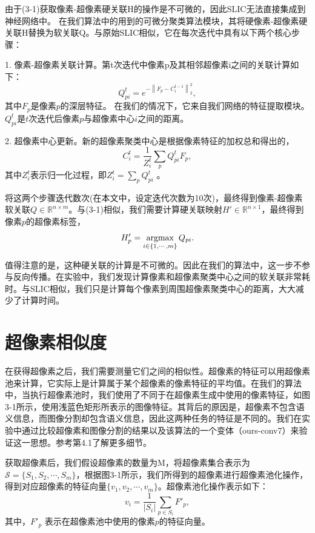 由于(3-1)获取像素-超像素硬关联H的操作是不可微的，因此SLIC无法直接集成到神经网络中。 在我们算法中的用到的可微分聚类算法模块，其将硬像素-超像素硬关联H替换为软关联Q。与原始SLIC相似，它在每次迭代中具有以下两个核心步骤：

1.	像素-超像素关联计算。第t次迭代中像素p及其相邻超像素i之间的关联计算如下：
\begin{equation}
Q_{pi}^{t} = e^{-\left \| F_{p}-C_{i}^{t-1}\right \|_2^2},
\end{equation}
其中\(F_{p}\)是像素$p$的深层特征。 在我们的情况下，它来自我们网络的特征提取模块。\(Q_{pi}^{t}\)是$t$次迭代后像素$p$与超像素中心$i$之间的距离。

2.	超像素中心更新。新的超像素聚类中心是根据像素特征的加权总和得出的，
\begin{equation}
C_{i}^{t} = \frac{1}{Z_{i}^{t}}\sum_{p}Q_{pi}^{t}F_{p},
\end{equation}
其中$Z_{i}^{t}$表示归一化过程，即$Z_{i}^{t} = \sum\nolimits_{p}Q_{pi}^{t} $ 。

将这两个步骤迭代数次(在本文中，设定迭代次数为10次)，最终得到像素-超像素软关联\(Q\in\mathbb{R}^{n\times m}\)。与(3-1)相似，我们需要计算硬关联映射$H'\in \mathbb{R}^{n\times 1}$，最终得到像素$p$的超像素标签，
\begin{equation}
H'_{p} =  \mathop{{{\rm argmax}}}\limits_{{i \in \left\{ 1, \cdots ,m \right\} }}Q_{pi}.
\label{equation.3}
\end{equation}

值得注意的是，这种硬关联的计算是不可微的。因此在我们的算法中，这一步不参与反向传播。在实验中，我们发现计算像素和超像素聚类中心之间的软关联非常耗时。与SLIC相似，我们只是计算每个像素到周围超像素聚类中心的距离，大大减少了计算时间。

\section{超像素相似度}
在获得超像素之后，我们需要测量它们之间的相似性。超像素的特征可以用超像素池来计算，它实际上是计算属于某个超像素的像素特征的平均值。在我们的算法中，当执行超像素池时，我们使用了不同于在超像素生成中使用的像素特征，如图3-1所示，使用浅蓝色矩形所表示的图像特征。其背后的原因是，超像素不包含语义信息，而图像分割却包含语义信息，因此这两种任务的特征是不同的。我们在实验中通过比较超像素和图像分割的结果以及该算法的一个变体（ours-conv7）来验证这一思想。参考第4.1了解更多细节。

获取超像素后，我们假设超像素的数量为M，将超像素集合表示为$\mathcal{S}=\{S_{1},S_{2},\cdots ,S_{m}\}$，根据图3-1所示，我们所得到的超像素进行超像素池化操作，得到对应超像素的特征向量$\{ v_{1},v_{2},\cdots,v_{m}\}$。超像素池化操作表示如下：
\begin{equation}
v_{i} = \frac{1}{|S_{i}|}\sum_{p\in S_{i} }F'_{p},
\end{equation}
其中，$F'_{p}$ 表示在超像素池中使用的像素$p$的特征向量。

